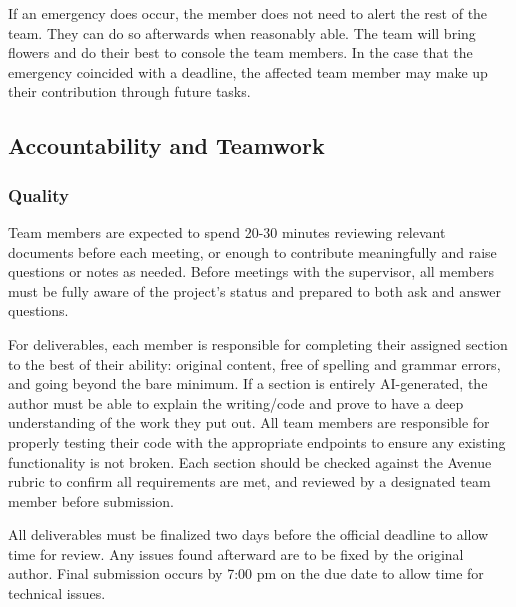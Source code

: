 \documentclass{article}
\begin{document}
If an emergency does occur, the member does not need to alert the rest of the team. 
They can do so afterwards when reasonably able. The team will bring flowers and do 
their best to console the team members. In the case that the emergency coincided with a 
deadline, the affected team member may make up their contribution through future tasks.

\subsection*{Accountability and Teamwork}

\subsubsection*{Quality} 

Team members are expected to spend 20-30 minutes reviewing relevant documents before each meeting, or enough to contribute meaningfully and raise questions or notes as needed. Before meetings with the supervisor, all members must be fully aware of the project's status and prepared to both ask and answer questions.

For deliverables, each member is responsible for completing their assigned section to the best of their ability: original content, free of spelling and grammar errors, and going beyond the bare minimum. If a section is entirely AI-generated, the author must be able to explain the writing/code and prove to have a deep understanding of the work they put out. All team members are responsible for properly testing their code with the appropriate endpoints to ensure any existing functionality is not broken. Each section should be checked against the Avenue rubric to confirm all requirements are met, and reviewed by a designated team member before submission.

All deliverables must be finalized two days before the official deadline to allow time for review. Any issues found afterward are to be fixed by the original author. Final submission occurs by 7:00 pm on the due date to allow time for technical issues.
\end{document}
